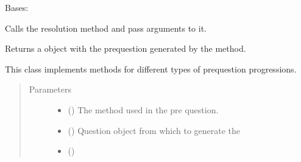 \documentclass[letterpaper,10pt,english]{sphinxmanual}
\begin{document}
\begin{fulllineitems}
\label{\detokenize{birdears:birdears.prequestion.PreQuestion}}
\sphinxAtStartPar
Bases: 

\begin{fulllineitems}
\label{\detokenize{birdears:birdears.prequestion.PreQuestion.__call__}}
\sphinxAtStartPar
Calls the resolution method and pass arguments to it.

\sphinxAtStartPar
Returns a  object with the pre\sphinxhyphen{}question generated by
the method.

\end{fulllineitems}


\begin{fulllineitems}
\label{\detokenize{birdears:birdears.prequestion.PreQuestion.__init__}}
\sphinxAtStartPar
This class implements methods for different types of pre\sphinxhyphen{}question
progressions.
\begin{quote}\begin{description}
\item[{Parameters}] \leavevmode\begin{itemize}
\item {} 
\sphinxAtStartPar
{} () \textendash{} The method used in the pre question.

\item {} 
\sphinxAtStartPar
{} () \textendash{} Question object from which to generate the

\item {} 
\sphinxAtStartPar
{} () \textendash{} 

\end{itemize}

\end{description}\end{quote}

\end{fulllineitems}


\end{fulllineitems}
\end{document}
